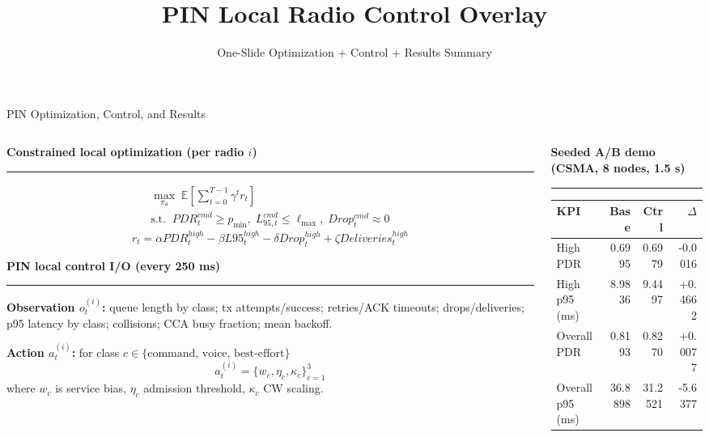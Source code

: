 \documentclass[10pt,aspectratio=169]{beamer}
\title{PIN Local Radio Control Overlay}
\subtitle{One-Slide Optimization + Control + Results Summary}
\author{}
\date{}
\begin{document}
\begin{frame}[t]{PIN Optimization, Control, and Results}
\footnotesize
\setlength{\columnsep}{1.2em}
\begin{columns}[T,onlytextwidth]
  \begin{column}{0.54\textwidth}
    {\bfseries Constrained local optimization (per radio \(i\))}\par
    \vspace{0.15em}\rule{\linewidth}{0.3pt}\vspace{0.35em}
    \begin{align*}
      \max_{\pi_\theta}\; \mathbb{E}\!\left[\sum_{t=0}^{T-1}\gamma^t r_t\right] \\
      \text{s.t.}\;\;
      PDR_t^{cmd}\ge p_{\min},\;
      L_{95,t}^{cmd}\le \ell_{\max},\;
      Drop_t^{cmd}\approx 0
    \end{align*}
    \vspace{-0.9em}
    \[
      r_t=\alpha PDR_t^{high}-\beta L95_t^{high}
      -\delta Drop_t^{high}+\zeta Deliveries_t^{high}
    \]

    \vspace{0.2em}
    {\bfseries PIN local control I/O (every 250 ms)}\par
    \vspace{0.15em}\rule{\linewidth}{0.3pt}\vspace{0.4em}
    {\scriptsize
    \textbf{Observation \(o_t^{(i)}\):} queue length by class; tx attempts/success;
    retries/ACK timeouts; drops/deliveries; p95 latency by class; collisions;
    CCA busy fraction; mean backoff.\par
    \vspace{0.35em}
    \textbf{Action \(a_t^{(i)}\):} for class \(c\in\{\text{command, voice, best-effort}\}\)
    \[
      a_t^{(i)}=\{w_c,\eta_c,\kappa_c\}_{c=1}^{3}
    \]
    \vspace{-0.65em}
    where \(w_c\) is service bias, \(\eta_c\) admission threshold, \(\kappa_c\) CW scaling.
    }
  \end{column}

  \begin{column}{0.42\textwidth}
    {\bfseries Seeded A/B demo (CSMA, 8 nodes, 1.5 s)}\par
    \vspace{0.15em}\rule{\linewidth}{0.3pt}\vspace{0.35em}
    \centering
    {\scriptsize
    \setlength{\tabcolsep}{3.0pt}
    \begin{tabular}{lrrr}
      \toprule
      KPI & Base & Ctrl & \(\Delta\) \\
      \midrule
      High PDR & 0.6995 & 0.6979 & -0.0016 \\
      High p95 (ms) & 8.9836 & 9.4497 & +0.4662 \\
      Overall PDR & 0.8193 & 0.8270 & +0.0077 \\
      Overall p95 (ms) & 36.8898 & 31.2521 & -5.6377 \\
      \bottomrule
    \end{tabular}
    }


\end{column}
\end{columns}
\end{frame}
\end{document}
